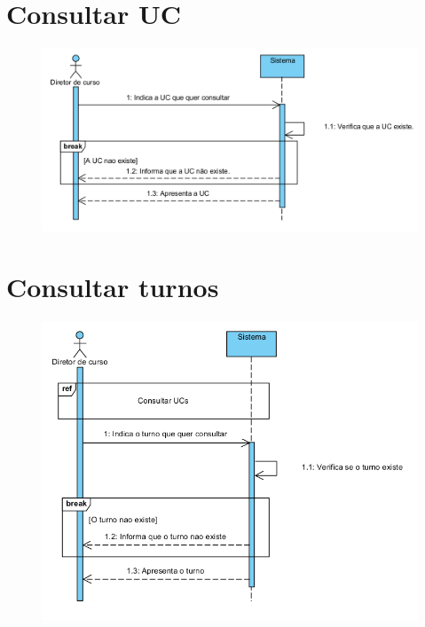 \documentclass[12pt,a4paper]{report}
\begin{document}
\begin{appendices}
\section{Consultar UC}
\begin{figure}[H]
	\centering 
	\includegraphics[width=\textwidth]{modelacao/use_case_diagram/admconsultaUCs.png}  
\end{figure}

\section{Consultar turnos}
\begin{figure}[H]
	\centering 
	\includegraphics[width=\textwidth]{modelacao/use_case_diagram/consultarturno.png}  
\end{figure}


\end{appendices}
\end{document}
